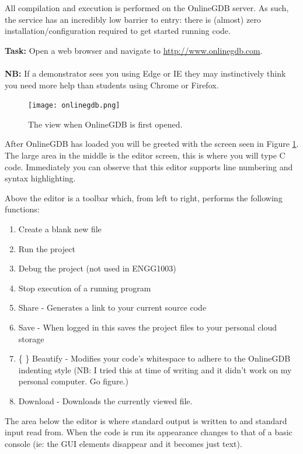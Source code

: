 \documentclass{lab}
\begin{document}
All compilation and execution is performed on the OnlineGDB server. As such, the service has an incredibly low barrier to entry: there is (almost) zero installation/configuration required to get started running code.

\textbf{Task:} Open a web browser and navigate to \url{http://www.onlinegdb.com}.\\ \\ \textbf{NB:} If a demonstrator sees you using Edge or IE they may instinctively think you need more help than students using Chrome or Firefox.

\begin{figure}[H]
\begin{center}
\texttt{[image: onlinegdb.png]}
\end{center}
\caption{The view when OnlineGDB is first opened.}\label{fig:onlinegdb}
\end{figure}

After OnlineGDB has loaded you will be greeted with the screen seen in Figure \ref{fig:onlinegdb}. The large area in the middle is the editor screen, this is where you will type C code. Immediately you can observe that this editor supports line numbering and syntax highlighting.

Above the editor is a toolbar which, from left to right, performs the following functions:

\begin{enumerate}
\item Create a blank new file
\item Run the project
\item Debug the project (not used in ENGG1003)
\item Stop execution of a running program
\item Share - Generates a link to your current source code
\item Save - When logged in this saves the project files to your personal cloud storage
\item \{ \} Beautify - Modifies your code's whitespace to adhere to the OnlineGDB indenting style (NB: I tried this at time of writing and it didn't work on my personal computer. Go figure.)
\item Download - Downloads the currently viewed file.
\end{enumerate}

The area below the editor is where standard output is written to and standard input read from. When the code is run its appearance changes to that of a basic console (ie: the GUI elements disappear and it becomes just text).
\end{document}
